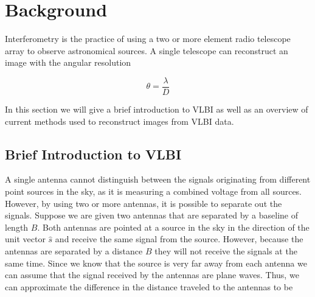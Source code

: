 \section{Background}
\label{section:background}



Interferometry is the practice of using a two or more element radio telescope array to observe astronomical sources.  A single telescope can reconstruct an image with  the angular resolution

\begin{equation}\theta = \frac{\lambda}{D}\end{equation}


In this section we will give a brief introduction to VLBI as well as an overview of current methods used to reconstruct images from VLBI data. 

\subsection{Brief Introduction to VLBI}

A single antenna cannot distinguish between the signals originating from different point sources in the sky, as it is measuring a combined voltage from all sources. However, by using two or more antennas, it is possible to separate out the signals. Suppose we are given two antennas that are separated by a baseline of length $B$. Both antennas are pointed at a source in the sky in the direction of the unit vector $\hat{s}$ and receive the same signal from the source. However, because the antennas are separated by a distance $B$ they will not receive the signals at the same time. Since we know that the source is very far away from each antenna we can assume that the signal received by the antennas are plane waves. Thus, we can approximate the difference in the distance traveled to the antennas to be 

